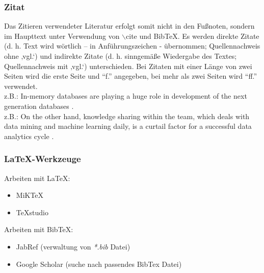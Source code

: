 \documentclass[11pt]{scrartcl}
\newcommand{\href}[2]{#2}
\begin{document}
\subsubsection{Zitat}
Das Zitieren verwendeter Literatur erfolgt somit nicht in den Fußnoten, sondern im Haupttext unter Verwendung von $\backslash$cite und BibTeX. Es werden direkte Zitate (d. h. Text wird wörtlich – in Anführungszeichen - übernommen; Quellennachweis ohne ‚vgl.‘) und indirekte Zitate (d. h. sinngemäße Wiedergabe des Textes; Quellennachweis mit ‚vgl.‘) unterschieden. Bei Zitaten mit einer Länge von zwei Seiten wird die erste Seite und "`f."' angegeben, bei mehr als zwei Seiten wird "`ff."' verwendet. \\

z.B.: In-memory databases are playing a huge role in development of the next generation databases \citep{VDInMemory:14}. \\

z.B.: On the other hand, knowledge sharing within the team, which deals with data mining and machine learning daily, is a curtail factor for a successful data analytics cycle \citep{ScalingAirbnb:2015}.


\subsubsection{LaTeX-Werkzeuge}

Arbeiten mit LaTeX:

\begin{itemize}
	\item \href{https://miktex.org/}{MiKTeX}
	\item \href{http://www.texstudio.org/}{TeXstudio}
\end{itemize}

Arbeiten mit BibTeX:

\begin{itemize}
	\item \href{http://www.jabref.org/}{JabRef} (verwaltung von \textit{*.bib} Datei)
	\item \href{https://scholar.google.de/}{Google Scholar} (suche nach passendes BibTex Datei)
\end{itemize}		
\end{document}

